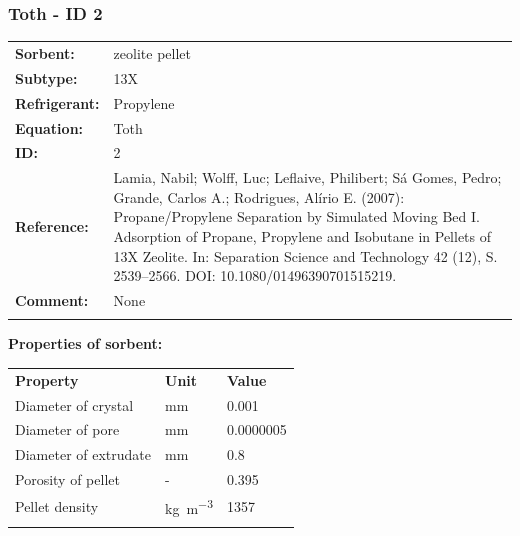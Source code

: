 \subsubsection{Toth - ID 2}
%
\begin{tabular}[l]{|lp{11.5cm}|}
\hline
\addlinespace

\textbf{Sorbent:} & zeolite pellet \\
\textbf{Subtype:} & 13X \\
\textbf{Refrigerant:} & Propylene \\
\textbf{Equation:} & Toth \\
\textbf{ID:} & 2 \\
\textbf{Reference:} & Lamia, Nabil; Wolff, Luc; Leflaive, Philibert; Sá Gomes, Pedro; Grande, Carlos A.; Rodrigues, Alírio E. (2007): Propane/Propylene Separation by Simulated Moving Bed I. Adsorption of Propane, Propylene and Isobutane in Pellets of 13X Zeolite. In: Separation Science and Technology 42 (12), S. 2539–2566. DOI: 10.1080/01496390701515219. \\
\textbf{Comment:} & None \\

\addlinespace
\hline
\end{tabular}
\newline

\textbf{Properties of sorbent:}
\newline
%
\begin{longtable}[l]{lll}
\toprule
\addlinespace
\textbf{Property} & \textbf{Unit} & \textbf{Value} \\
\addlinespace
\midrule
\endhead
\bottomrule
\endfoot
\bottomrule
\endlastfoot
\addlinespace

Diameter of crystal & \si{\milli\meter} & 0.001\\
Diameter of pore & \si{\milli\meter} & 0.0000005\\
Diameter of extrudate & \si{\milli\meter} & 0.8\\
Porosity of pellet & - & 0.395\\
Pellet density & \si{\kilogram\per\cubic\meter} & 1357\\

\addlinespace\end{longtable}

